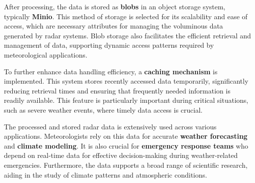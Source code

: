 After processing, the data is stored as \textbf{blobs} in an object storage
system, typically \textbf{Minio}. This method of storage is selected for its
scalability and ease of access, which are necessary attributes for managing the
voluminous data generated by radar systems. Blob storage also facilitates the
efficient retrieval and management of data, supporting dynamic access patterns
required by meteorological applications.

To further enhance data handling efficiency, a \textbf{caching mechanism} is
implemented. This system stores recently accessed data temporarily,
significantly reducing retrieval times and ensuring that frequently needed
information is readily available. This feature is particularly important during
critical situations, such as severe weather events, where timely data access is
crucial.

The processed and stored radar data is extensively used across various
applications. Meteorologists rely on this data for accurate \textbf{weather
forecasting} and \textbf{climate modeling}. It is also crucial for
\textbf{emergency response teams} who depend on real-time data for effective
decision-making during weather-related emergencies. Furthermore, the data
supports a broad range of scientific research, aiding in the study of climate
patterns and atmospheric conditions.
